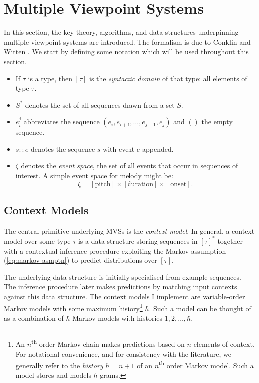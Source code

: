 \documentclass[12pt,a4paper,twoside,openright]{report}
\begin{document}
\section{Multiple Viewpoint Systems}

In this section, the key theory, algorithms, and data structures underpinning
multiple viewpoint systems are introduced. The formalism is due to Conklin and
Witten \cite{conklin1995viewpoints}. We start by defining some notation which
will be used throughout this section.

\begin{itemize}[itemsep=0mm]
  \item If $\tau$ is a type, then $[\tau]$ is the \emph{syntactic domain} of
    that type: all elements of type $\tau$.   
  \item $S^*$ denotes the set of all sequences drawn from a set $S$.
  \item $e_i^j$ abbreviates the sequence $(e_i,e_{i+1},\ldots,e_{j-1},e_j)$ and
    $()$ the empty sequence.
  \item $s :: e$ denotes the sequence $s$ with event $e$ appended.
  \item $\zeta$ denotes the \emph{event space}, the set of all events that occur
    in sequences of interest. A simple event space for melody might be:
    $$ \zeta = [\mathrm{pitch}] \times [\mathrm{duration}] \times [\mathrm{onset}]. $$
\end{itemize}

\subsection{Context Models}\label{sec:ctx-model-prep}

The central primitive underlying MVSs is the \emph{context model}. In general,
a context model over some type $\tau$ is a data structure storing sequences in
$[\tau]^*$ together with a contextual inference procedure exploiting the Markov
assumption (\ref{eq:markov-asmptn}) to predict distributions over $[\tau]$. 

The underlying data structure is initially specialised from example sequences.
The inference procedure later makes predictions by matching input contexts
against this data structure. The context models I implement are variable-order
Markov models with some maximum history\footnote{ An $n$\textsuperscript{th}
  order Markov chain makes predictions based on $n$ elements of context. For
  notational convenience, and for consistency with the literature, we generally
  refer to the \emph{history} $h = n+1$ of an $n$\textsuperscript{th} order
Markov model.  Such a model stores and models $h$-grams.  } $\hbar$. Such a
model can be thought of as a combination of $\hbar$ Markov models with histories
$1,2,\ldots,\hbar$. 
\end{document}
